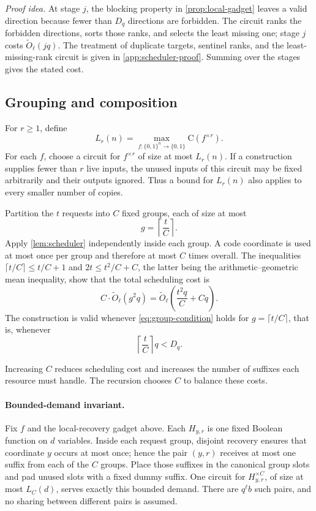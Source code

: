 \documentclass[11pt]{article}
\newcommand{\bits}{\{0,1\}}
\newcommand{\C}{\mathrm{C}}
\begin{document}
\emph{Proof idea.}
At stage $j$, the blocking property in \cref{prop:local-gadget} leaves a valid
direction because fewer than $D_q$ directions are forbidden.  The circuit
ranks the forbidden directions, sorts those ranks, and selects the least
missing one; stage $j$ costs $\widetilde O_\ell(jq)$.  The treatment of
duplicate targets, sentinel ranks, and the least-missing-rank circuit is given
in \cref{app:scheduler-proof}.  Summing over the stages gives the stated cost.

\subsection{Grouping and composition}

For $r\ge1$, define
\[
  L_r(n)=\max_{f:\bits^n\to\bits}\C(f^{\times r}).
\]
For each $f$, choose a circuit for $f^{\times r}$ of size at most $L_r(n)$.  If
a construction supplies fewer than $r$ live inputs, the unused inputs of this
circuit may be fixed arbitrarily and their outputs ignored.  Thus a bound for
$L_r(n)$ also applies to every smaller number of copies.

Partition the $t$ requests into $C$ fixed groups, each of size at most
\[
  g=\left\lceil\frac{t}{C}\right\rceil.
\]
Apply \cref{lem:scheduler} independently inside each group.  A code coordinate
is used at most once per group and therefore at most $C$ times overall.  The
inequalities $\lceil t/C\rceil\le t/C+1$ and
$2t\le t^2/C+C$, the latter being the arithmetic--geometric mean inequality,
show that the total scheduling cost is
\begin{equation}\label{eq:scheduling-cost}
  C\cdot\widetilde O_\ell(g^2q)
  =\widetilde O_\ell\!\left(\frac{t^2q}{C}+Cq\right).
\end{equation}
The construction is valid whenever \eqref{eq:group-condition} holds for
$g=\lceil t/C\rceil$, that is, whenever
\begin{equation}\label{eq:scheduling-condition}
  \left\lceil\frac{t}{C}\right\rceil q<D_q.
\end{equation}

Increasing $C$ reduces scheduling cost and increases the number of suffixes
each resource must handle.  The recursion chooses $C$ to balance these costs.

\paragraph{Bounded-demand invariant.}
Fix $f$ and the local-recovery gadget above.  Each $H_{y,r}$ is one fixed
Boolean function on $d$ variables.  Inside each request group, disjoint
recovery ensures that coordinate $y$ occurs at most once; hence the pair
$(y,r)$ receives at most one suffix from each of the $C$ groups.  Place those
suffixes in the canonical group slots and pad unused slots with a fixed dummy
suffix.  One circuit for $H_{y,r}^{\times C}$, of size at most $L_C(d)$,
serves exactly this bounded demand.  There are $q^\ell b$ such pairs, and no
sharing between different pairs is assumed.
\end{document}
